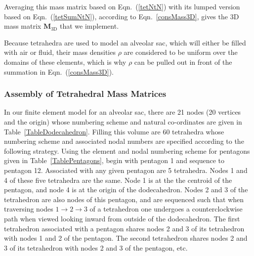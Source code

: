 Averaging this mass matrix based on Eqn.~(\ref{tetNtN}) with its lumped version based on Eqn.~(\ref{tetSumNtN}), according to Eqn.~\eqref{consMass3D}, gives the 3D mass matrix $\mathbf{M}_{\textrm{3D}}$ that we implement.

Because tetrahedra are used to model an alveolar sac, which will either be filled with air or fluid, their mass densities $\rho$ are considered to be uniform over the domains of these elements, which is why $\rho$ can be pulled out in front of the summation in Eqn.~(\ref{consMass3D}).

\subsubsection{Assembly of Tetrahedral Mass Matrices}

In our finite element model for an alveolar sac, there are 21 nodes (20 vertices and the origin) whose numbering scheme and natural co-ordinates are given in Table~\ref{TableDodecahedron}.  Filling this volume are 60 tetrahedra whose numbering scheme and associated nodal numbers are specified according to the following strategy.  Using the element and nodal numbering scheme for pentagons given in Table~\ref{TablePentagons}, begin with pentagon 1 and sequence to pentagon 12.  Associated with any given pentagon are 5 tetrahedra.  Nodes 1 and 4 of these five tetrahedra are the same.  Node 1 is at the the centroid of the pentagon, and node 4 is at the origin of the dodecahedron.  Nodes 2 and 3 of the tetrahedron are also nodes of this pentagon, and are sequenced such that when traversing nodes $1 \to 2 \to 3$ of a tetrahedron one undergoes a counter\-clockwise path when viewed looking inward from outside of the dodecahedron.  The first tetrahedron associated with a pentagon shares nodes 2 and 3 of its tetrahedron with nodes 1 and 2 of the pentagon.  The second tetrahedron shares nodes 2 and 3 of its tetrahedron with nodes 2 and 3 of the pentagon, etc.

